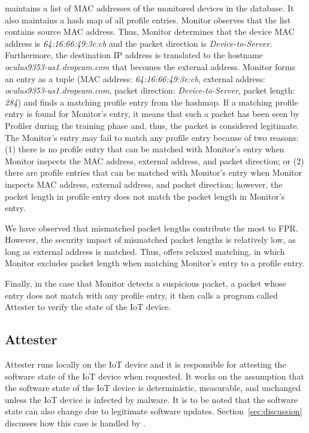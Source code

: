 \system{} maintains a list of MAC addresses of the monitored devices in the database. It also maintains a hash map of all profile entries. Monitor observes that the list contains source MAC address. Thus, Monitor determines that the device MAC address is \textit{64:16:66:49:3e:cb} and the packet direction is \textit{Device-to-Server}. Furthermore, the destination IP address is translated to the hostname \textit{oculus9353-us1.dropcam.com} that becomes the external address. 
Monitor forms an entry as a tuple (MAC address: \textit{64:16:66:49:3e:cb}, external address: \textit{oculus9353-us1.dropcam.com}, packet direction: \textit{Device-to-Server}, packet length: \textit{284}) and finds a matching profile entry from the hashmap. 
If a matching profile entry is found for Monitor's entry, it means that such a packet has been seen by Profiler during the training phase and, thus, the packet is considered legitimate. The Monitor's entry may fail to match any profile entry because of two reasons: (1) there is no profile entry that can be matched with Monitor's entry when Monitor inspects the MAC address, external address, and packet direction; or (2) there are profile entries that can be matched with Monitor's entry when Monitor inspects MAC address, external address, and packet direction; however, the packet length in profile entry does not match the packet length in Monitor's entry.
   
We have observed that mismatched packet lengths contribute the most to FPR. However, the security impact of mismatched packet lengths is relatively low, as long as external address is matched. Thus, \system{} offers relaxed matching, in which Monitor excludes packet length when matching Monitor's entry to a profile entry.

Finally, in the case that Monitor detects a suspicious packet, \ie{} a packet whose entry does not match with any profile entry, it then calls a program called Attester to verify the state of the IoT device.  


\subsection{Attester}
Attester runs locally on the IoT device and it is responsible for attesting the software state of the IoT device when requested. It works on the assumption that the software state of the IoT device is deterministic, measurable, and unchanged unless the IoT device is infected by malware. It is to be noted that the software state can also change due to legitimate software updates. Section~\ref{sec:discussion} discusses how this case is handled by \system{}.
 
